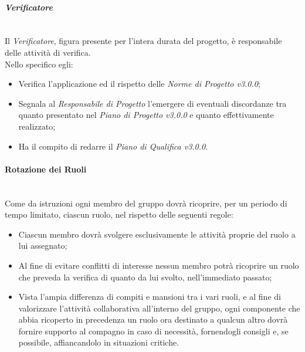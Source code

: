 \paragraph{\textit{Verificatore}} ~\\
	Il \textit{Verificatore}, figura presente per l'intera durata del progetto, è responsabile delle attività di 				verifica.\\
	Nello specifico egli:
	\begin{itemize}
	\item Verifica l'applicazione ed il rispetto delle \textit{Norme di Progetto v3.0.0};
	\item Segnala al \textit{Responsabile di Progetto} l'emergere di eventuali discordanze tra quanto presentato nel 			\textit{Piano di Progetto v3.0.0} e quanto effettivamente realizzato;
	\item Ha il compito di redarre il \textit{Piano di Qualifica v3.0.0}.
	\end{itemize}

\paragraph{Rotazione dei Ruoli} ~\\
	Come da istruzioni ogni membro del gruppo dovrà ricoprire, per un periodo di tempo limitato, ciascun ruolo, nel 			rispetto delle seguenti regole:
	\begin{itemize}
	\item Ciascun membro dovrà svolgere esclusivamente le attività proprie del ruolo a lui assegnato;
	\item Al fine di evitare conflitti di interesse nessun membro potrà ricoprire un ruolo che preveda la 									verifica di quanto da lui svolto, nell'immediato passato;
	\item Vista l'ampia differenza di compiti e mansioni tra i vari ruoli, e al fine di valorizzare l'attività 						collaborativa all'interno del gruppo, ogni componente che abbia ricoperto in precedenza un ruolo ora destinato 			a qualcun altro dovrà fornire supporto al compagno in caso di necessità, fornendogli consigli e, se possibile, 			affiancandolo in situazioni critiche.
	\end{itemize}
